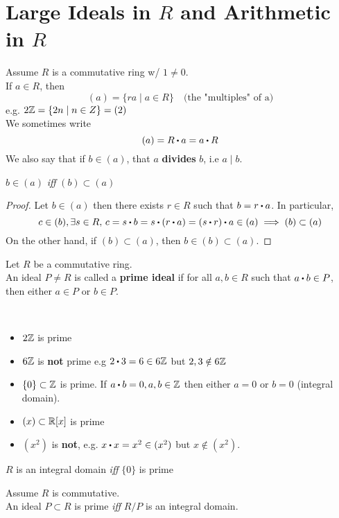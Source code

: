 \documentclass[../Main.tex]{subfiles}
\begin{document}
\section*{Large Ideals in \texorpdfstring{$R$}{TEXT} and Arithmetic in \texorpdfstring{$R$}{TEXT}}
Assume $R$ is a commutative ring w/ $1\ne 0$. \\
If $a\in R$, then
\[(a)=\{ra\mid a\in R\} \quad \text{(the "multiples" of a)}\]
e.g. $2\mathbb{Z}=\{2n\mid n\in Z\}=(2)$\\
\Note We sometimes write
\[(a)=R\rdot a=a\rdot R\]
We also say that if $b\in (a)$, that $a$ \textbf{divides} $b$, i.e $a\mid b$.
\begin{claim}
	$b\in (a)$ \textit{iff} $(b) \subset (a)$
\end{claim}
\begin{proof}
	Let $b\in (a)$ then there exists $r\in R$ such that $b=r\rdot a$. In particular,
	\[c\in (b), \exists s\in R, \, c=s\rdot b=s\rdot (r\rdot a)=(s\rdot r)\rdot a\in (a)\implies (b) \subset (a)\]
	On the other hand, if $(b)\subset (a)$, then $b\in (b) \subset (a)$.
\end{proof}
\begin{dfn}[title = Prime Ideal]
	Let $R$ be a commutative ring.\\
	An ideal $P\ne R$ is called a \textbf{prime ideal} if for all $a,b\in R$ such that $a\rdot b\in P$, then either $a\in P$ or $b\in P$.
\end{dfn}
\newpage
\begin{example}~
\begin{itemize}
	\item$2\mathbb{Z}$ is prime
	\item$6\mathbb{Z}$ is \textbf{not} prime e.g $2\rdot 3 = 6 \in 6\Z$ but $2,3\notin 6\mathbb{Z}$
	\item $\{0\} \subset \mathbb{Z}$ is prime. If $a\rdot b=0, a,b \in \Z$ then either $a=0$ or $b=0$ (integral domain).
	\item $(x)\subset \mathbb{R}[x]$ is prime
	\item $(x^2)$ is \textbf{not}, e.g. $x\rdot x=x^2\in (x^2)$ but $x\notin (x^2)$.
\end{itemize}
\end{example}
\begin{prop}[title = \texorpdfstring{$R$}{R} integral if \texorpdfstring{$\{0\}$}{\{0\}} prime]
	$R$ is an integral domain \textit{iff} $\{0\}$ is prime
\end{prop}
\begin{thm}[title = Prime Ideal \texorpdfstring{$\Longleftrightarrow R/P$}{R/P} integral domain]
	Assume $R$ is commutative.\\
	An ideal $P\subset R$ is prime \textit{iff} $R/P$ is an integral domain.
\end{thm}
\end{document}
